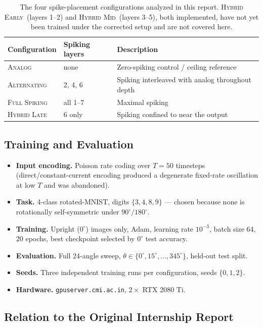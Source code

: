\documentclass[11pt]{article}
\newcommand{\Analog}{\textsc{Analog}}
\newcommand{\Alternating}{\textsc{Alternating}}
\newcommand{\FullSpiking}{\textsc{Full Spiking}}
\newcommand{\HybridLate}{\textsc{Hybrid Late}}
\newcommand{\HybridEarly}{\textsc{Hybrid Early}}
\newcommand{\HybridMid}{\textsc{Hybrid Mid}}
\begin{document}
\begin{table}[H]
\centering
\begin{tabular}{@{}lll@{}}
\toprule
\textbf{Configuration} & \textbf{Spiking layers} & \textbf{Description} \\
\midrule
\Analog & none & Zero-spiking control / ceiling reference \\
\Alternating & 2, 4, 6 & Spiking interleaved with analog throughout depth \\
\FullSpiking & all 1--7 & Maximal spiking \\
\HybridLate & 6 only & Spiking confined to near the output \\
\bottomrule
\end{tabular}
\caption{The four spike-placement configurations analyzed in this report. \HybridEarly\ (layers
1--2) and \HybridMid\ (layers 3--5), both implemented, have not yet been trained under the corrected
setup and are not covered here.}
\label{tab:configs}
\end{table}

\subsection{Training and Evaluation}

\begin{itemize}[leftmargin=1.5em]
\item \textbf{Input encoding.} Poisson rate coding over $T = 50$ timesteps (direct/constant-current
encoding produced a degenerate fixed-rate oscillation at low $T$ and was abandoned).
\item \textbf{Task.} 4-class rotated-MNIST, digits $\{3, 4, 8, 9\}$ --- chosen because none is
rotationally self-symmetric under $90^\circ/180^\circ$.
\item \textbf{Training.} Upright ($0^\circ$) images only, Adam, learning rate $10^{-3}$, batch size
64, 20 epochs, best checkpoint selected by $0^\circ$ test accuracy.
\item \textbf{Evaluation.} Full 24-angle sweep, $\theta \in \{0^\circ, 15^\circ, \ldots, 345^\circ\}$,
held-out test split.
\item \textbf{Seeds.} Three independent training runs per configuration, seeds $\{0, 1, 2\}$.
\item \textbf{Hardware.} \texttt{gpuserver.cmi.ac.in}, $2\times$ RTX 2080 Ti.
\end{itemize}

\subsection{Relation to the Original Internship Report}
\end{document}
